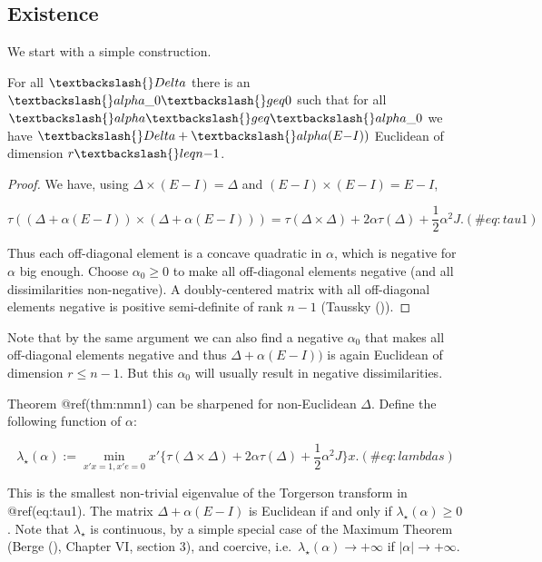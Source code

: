 \documentclass[
  12pt,
  letterpaper,
  DIV=11,
  numbers=noendperiod]{scrreprt}
\newenvironment{Shaded}{\begin{snugshade}}{\end{snugshade}}
\newcommand{\NormalTok}[1]{\textcolor[rgb]{0.00,0.23,0.31}{#1}}
\theoremstyle{remark}
\begin{document}
\subsection{Existence}\label{existence}

We start with a simple construction.

\begin{Shaded}
\begin{Highlighting}[]
\NormalTok{For all $\textbackslash{}Delta$ there is an $\textbackslash{}alpha\_0\textbackslash{}geq 0$ such that for all $\textbackslash{}alpha\textbackslash{}geq\textbackslash{}alpha\_0$ we have $\textbackslash{}Delta+\textbackslash{}alpha(E{-}I))$ Euclidean of dimension $r\textbackslash{}leq n{-}1$.}
\end{Highlighting}
\end{Shaded}

\begin{proof}
We have, using \(\Delta\times(E-I)=\Delta\) and
\((E-I)\times(E-I)=E-I\),

\begin{equation}
  \tau((\Delta+\alpha(E-I))\times(\Delta+\alpha(E-I)))=
  \tau(\Delta\times\Delta)+2\alpha\tau(\Delta)+\frac12\alpha^2J.
(\#eq:tau1)
\end{equation}

Thus each off-diagonal element is a concave quadratic in \(\alpha\),
which is negative for \(\alpha\) big enough. Choose \(\alpha_0\geq 0\)
to make all off-diagonal elements negative (and all dissimilarities
non-negative). A doubly-centered matrix with all off-diagonal elements
negative is positive semi-definite of rank \(n-1\) (Taussky
()).
\end{proof}

Note that by the same argument we can also find a negative \(\alpha_0\)
that makes all off-diagonal elements negative and thus
\(\Delta+\alpha(E-I))\) is again Euclidean of dimension \(r\leq n-1\).
But this \(\alpha_0\) will usually result in negative dissimilarities.

Theorem @ref(thm:nmn1) can be sharpened for non-Euclidean \(\Delta\).
Define the following function of \(\alpha\):

\begin{equation}
\lambda_\star(\alpha):=\min_{x'x=1, x'e=0}x'\{\tau(\Delta\times\Delta)+2\alpha\tau(\Delta)+\frac12\alpha^2J\}x.
(\#eq:lambdas)
\end{equation}

This is the smallest non-trivial eigenvalue of the Torgerson transform
in @ref(eq:tau1). The matrix \(\Delta+\alpha(E-I)\) is Euclidean if and
only if \(\lambda_\star(\alpha)\geq 0\). Note that \(\lambda_\star\) is
continuous, by a simple special case of the Maximum Theorem (Berge
(), Chapter VI, section 3), and coercive,
i.e.~\(\lambda_\star(\alpha)\rightarrow +\infty\) if
\(|\alpha|\rightarrow +\infty\).
\end{document}

